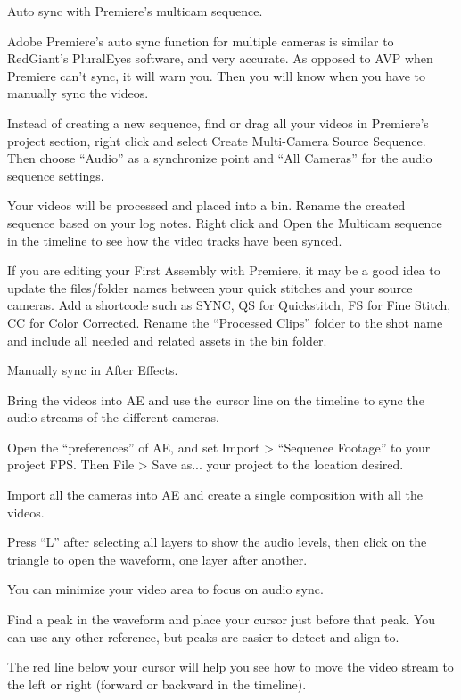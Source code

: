 \begin{fullwidth}
{\large Auto sync with Premiere’s multicam sequence. \par}

Adobe Premiere’s auto sync function for multiple cameras is similar to RedGiant’s PluralEyes software, and very accurate. As opposed to AVP when Premiere can’t sync, it will warn you. Then you will know when you have to manually sync the videos.

Instead of creating a new sequence, find or drag all your videos in Premiere’s project section, right click and select Create Multi-Camera Source Sequence. Then choose “Audio” as a synchronize point and “All Cameras” for the audio sequence settings.

Your videos will be processed and placed into a bin. Rename the created sequence based on your log notes. Right click and Open the Multicam sequence in the timeline to see how the video tracks have been synced.

If you are editing your First Assembly with Premiere, it may be a good idea to update the files/folder names between your quick stitches and your source cameras. Add a shortcode such as SYNC, QS for Quickstitch, FS for Fine Stitch, CC for Color Corrected. Rename the “Processed Clips” folder to the shot name and include all needed and related assets in the bin folder.

{\large Manually sync in After Effects. \par}

Bring the videos into AE and use the cursor line on the timeline to sync the audio streams of the different cameras.

Open the “preferences” of AE, and set Import > “Sequence Footage” to your project FPS. Then File > Save as... your project to the location desired.

Import all the cameras into AE and create a single composition with all the videos.

Press “L” after selecting all layers to show the audio levels, then click on the triangle to open the waveform, one layer after another. 

You can minimize your video area to focus on audio sync.

Find a peak in the waveform and place your cursor just before that peak. You can use any other reference, but peaks are easier to detect and align to.

The red line below your cursor will help you see how to move the video stream to the left or right (forward or backward in the timeline). 


\end{fullwidth}
